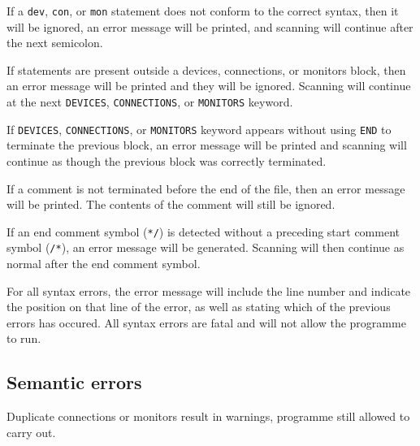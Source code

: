 \documentclass[a4paper,10pt]{article}
\begin{document}
If a \texttt{dev}, \texttt{con}, or \texttt{mon} statement does not conform to the correct syntax, then it will be ignored, an error message will be printed, and scanning will continue after the next semicolon. 

If statements are present outside a devices, connections, or monitors block, then an error message will be printed and they will be ignored. Scanning will continue at the next \texttt{DEVICES}, \texttt{CONNECTIONS}, or \texttt{MONITORS} keyword. 

If \texttt{DEVICES}, \texttt{CONNECTIONS}, or \texttt{MONITORS} keyword appears without using \texttt{END} to terminate the previous block, an error message will be printed and scanning will continue as though the previous block was correctly terminated. 

If a comment is not terminated before the end of the file, then an error message will be printed. The contents of the comment will still be ignored.

If an end comment symbol (\texttt{*/}) is detected without a preceding start comment symbol (\texttt{/*}), an error message will be generated. Scanning will then continue as normal after the end comment symbol. 

For all syntax errors, the error message will include the line number and indicate the position on that line of the error, as well as stating which of the previous errors has occured. All syntax errors are fatal and will not allow the programme to run.

\subsection{Semantic errors}

Duplicate connections or monitors result in warnings, programme still allowed to carry out.
\end{document}
